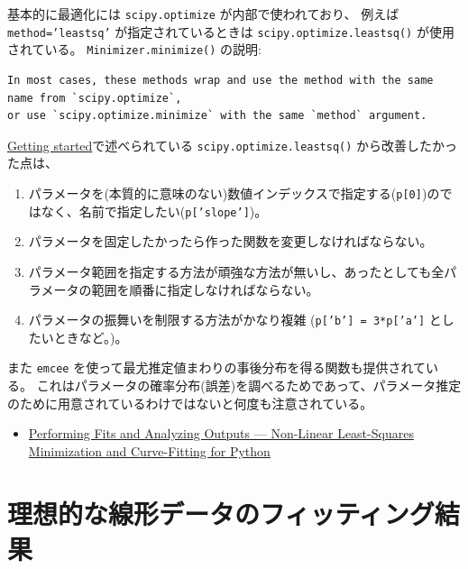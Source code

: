 \documentclass[a4paper, 9pt, notitlepage, uplatex, dvipdfmx]{jsarticle}
\begin{document}
基本的に最適化には \texttt{scipy.optimize} が内部で使われており、 例えば \texttt{method='leastsq'} が指定されているときは \texttt{scipy.optimize.leastsq()} が使用されている。
\texttt{Minimizer.minimize()} の説明:
\begin{verbatim}
In most cases, these methods wrap and use the method with the same name from `scipy.optimize`,
or use `scipy.optimize.minimize` with the same `method` argument.
\end{verbatim}

\href{https://lmfit.github.io/lmfit-py/intro.html}{Getting started}で述べられている \texttt{scipy.optimize.leastsq()} から改善したかった点は、
\begin{enumerate}
\item パラメータを(本質的に意味のない)数値インデックスで指定する(\texttt{p[0]})のではなく、名前で指定したい(\texttt{p['slope']})。
\item パラメータを固定したかったら作った関数を変更しなければならない。
\item パラメータ範囲を指定する方法が頑強な方法が無いし、あったとしても全パラメータの範囲を順番に指定しなければならない。
\item パラメータの振舞いを制限する方法がかなり複雑 (\texttt{p['b'] = 3*p['a']} としたいときなど。)。
\end{enumerate}

また \texttt{emcee} を使って最尤推定値まわりの事後分布を得る関数も提供されている。
これはパラメータの確率分布(誤差)を調べるためであって、パラメータ推定のために用意されているわけではないと何度も注意されている。
\begin{itemize}
\item \href{https://lmfit.github.io/lmfit-py/fitting.html\#minimizer-emcee-calculating-the-posterior-probability-distribution-of-parameters}{Performing Fits and Analyzing Outputs — Non-Linear Least-Squares Minimization and Curve-Fitting for Python}
\end{itemize}
\section{理想的な線形データのフィッティング結果}
\label{sec:org4a007d0}
\end{document}
